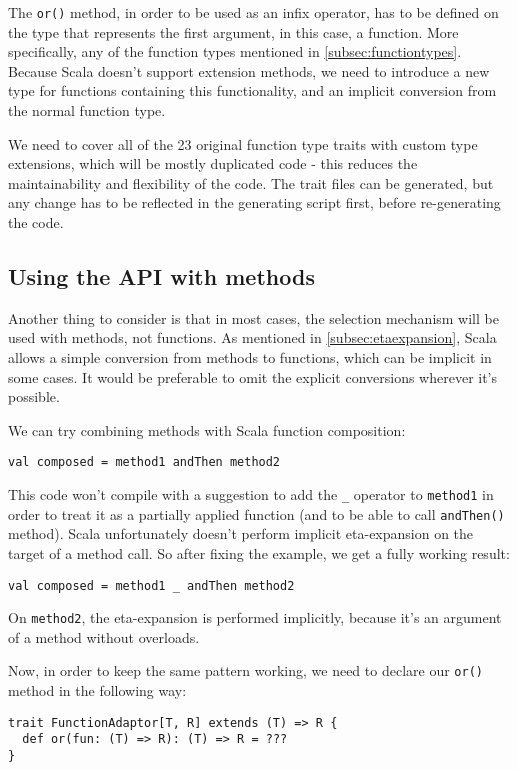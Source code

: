 The \lstinline|or()| method, in order to be used as an infix operator, has to be defined on the type that represents the first argument, in this case, a function. More specifically, any of the function types mentioned in \ref{subsec:functiontypes}. Because Scala doesn't support extension methods, we need to introduce a new type for functions containing this functionality, and an implicit conversion from the normal function type.

We need to cover all of the 23 original function type traits with custom type extensions, which will be mostly duplicated code - this reduces the maintainability and flexibility of the code. The trait files can be generated, but any change has to be reflected in the generating script first, before re-generating the code.

\subsection{Using the API with methods}
\label{subsec:apimethods}

Another thing to consider is that in most cases, the selection mechanism will be used with methods, not functions. As mentioned in \ref{subsec:etaexpansion}, Scala allows a simple conversion from methods to functions, which can be implicit in some cases. It would be preferable to omit the explicit conversions wherever it's possible.

We can try combining methods with Scala function composition:
\lstset{style=Scala}
\begin{lstlisting}
val composed = method1 andThen method2
\end{lstlisting}

This code won't compile with a suggestion to add the \lstinline|_| operator to \lstinline|method1| in order to treat it as a partially applied function (and to be able to call \lstinline|andThen()| method). Scala unfortunately doesn't perform implicit eta-expansion on the target of a method call. So after fixing the example, we get a fully working result:

\lstset{style=Scala}
\begin{lstlisting}
val composed = method1 _ andThen method2
\end{lstlisting}

On \lstinline|method2|, the eta-expansion is performed implicitly, because it's an argument of a method without overloads.

Now, in order to keep the same pattern working, we need to declare our \lstinline|or()| method in the following way:
\lstset{style=Scala}
\begin{lstlisting}
trait FunctionAdaptor[T, R] extends (T) => R {
  def or(fun: (T) => R): (T) => R = ???
}
\end{lstlisting}

